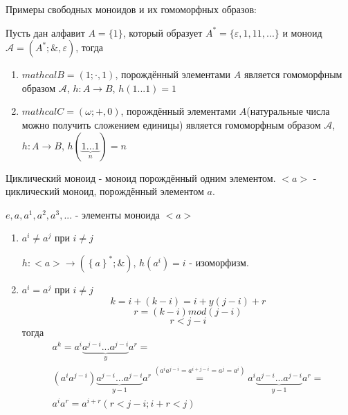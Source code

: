 \documentclass[../main/document.tex]{subfiles}
\begin{document}
\begin{exm}
Примеры свободных моноидов и их гомоморфных образов:

Пусть дан алфавит $A=\{1\}$, который образует $A^*=\{\varepsilon,1,11,...\}$ и моноид $\mathcal{A}=(A^*;\&,\varepsilon)$, тогда
\begin{enumerate}
\item $mathcal{B}=({1};\cdot,1)$, порождённый элементами $A$ является гомоморфным образом $\mathcal{A}$, $h:A\rightarrow B$, $h(1...1)=1$
\item $mathcal{C}=(\omega;+,0)$, порождённый элементами $A$(натуральные числа можно получить сложением единицы) является гомоморфным образом $\mathcal{A}$, $h:A\rightarrow B$, $h(\underbrace{1...1}_n)=n$
\end{enumerate}
\end{exm}

\begin{dfn}

Циклический моноид - моноид порождённый одним элементом. $<a>$ - циклический моноид, порождённый элементом $a$.

$e,a,a^1,a^2,a^3,...$ - элементы моноида $<a>$

\begin{enumerate}
\item $a^i\neq a^j$ при $i\neq j$

$h:<a>\rightarrow ({\left\{a\right\}}^*;\&)$, $h(a^i)=i$ - изоморфизм.
\item $a^i=a^j$ при $i\neq j$
$$k=i+(k-i)=i+y(j-i)+r$$
$$r=(k-i)mod(j-i)$$
$$r<j-i$$
тогда
\begin{multline*}
a^k=a^i\underbrace{a^{j-i}...a^{j-i}}_{y}a^r=\\
(a^ia^{j-i})\underbrace{a^{j-i}...a^{j-i}}_{y-1}a^r\stackrel{(a^ia^{j-i}=a^{i+j-i}=a^j=a^i)}{=}a^i\underbrace{a^{j-i}...a^{j-i}}_{y-1}a^r=\\
a^ia^r=a^{i+r} (r<j-i; i+r<j)
\end{multline*}
\end{enumerate}
\end{dfn} %
\end{document}
